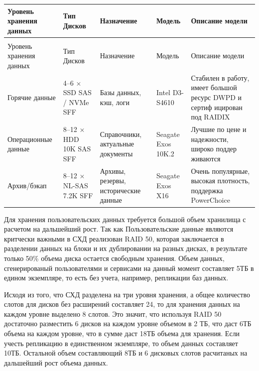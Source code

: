 \documentclass[14pt, a4paper]{extarticle}
\begin{document}
\begin{tabularx}{\textwidth}{|l|X|X|X|X|}
  \caption{Уровни хранения данных СХД\label{tab:DSS_storage_levels}}                                                                                                                         \\
  \hline
  Уровень хранения данных & Тип Дисков               & Назначение                           & Модель             & Описание модели                                                           \\\hline
  \endfirsthead
  \caption*{Продолжение таблицы~\ref{tab:DSS_storage_levels}}                                                                                                                                \\
  \hline
  Уровень хранения данных & Тип Дисков               & Назначение                           & Модель             & Описание модели                                                           \\\hline
  \endhead
  \endfoot
  \endlastfoot

  Горячие данные          & 4–6 × SSD SAS / NVMe SFF & Базы данных, кэш, логи               & Intel D3-S4610     & Стабилен в работу, имеет большой ресурс DWPD и сертиф ицирован под RAIDIX \\\hline
  Операционные данные     & 8–12 × HDD 10K SAS   SFF & Справочники, актуальные документы    & Seagate Exos 10K.2 & Лучшие по цене и надежности, широко поддер живаются                       \\\hline
  Архив/бэкап             & 8–12 × NL-SAS 7.2K   SFF & Архивы, резервы, исторические данные & Seagate Exos X16   & Очень популярные, высокая плотность, поддержка PowerChoice                \\\hline
\end{tabularx}

Для хранения пользовательских данных требуется большой объем
хранилища с расчетом на дальшейший рост. Так как Пользовательские данные являются
критчески важными в СХД реализован RAID 50, которая заключается в
разделении данных на блоки и их дублировании на разных дисках, в результате
только 50\% объема диска остается свободным хранения.
Объем данных, сгенерированый пользователями и сервисами на данный момент
составляет 5ТБ в едином экземпляре, то есть без учета, например, репликации
баз данных.

Исходя из того, что СХД разделена на три уровня хранения, а общее количество
слотов для дисков без расширений составляет 24, то для хранения данных на каждом
уровне выделено 8 слотов. Это значит, что используя RAID 50
достаточно разместить 6 дисков на каждом уровне объемом в 2 ТБ, что даст 6ТБ
объема на каждом уровне, что в сумме даст 18ТБ объема для хранения.
Если учесть репликацию в единственном экземпляре, то объем данных
составляет 10ТБ. Остальной объем составляющий 8ТБ и 6 дисковых слотов
расчитаных на дальшейший рост объема данных.
\end{document}
